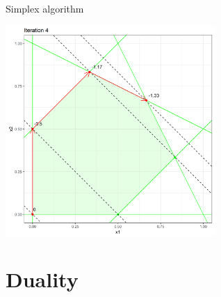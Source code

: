 \begin{vbframe}{Simplex algorithm}
\framebreak

\begin{center}
\includegraphics[width = 0.6\textwidth]{figure_man/simplex_implementation/iter4.png}
\end{center}

\end{vbframe}

%

\section{Duality}

